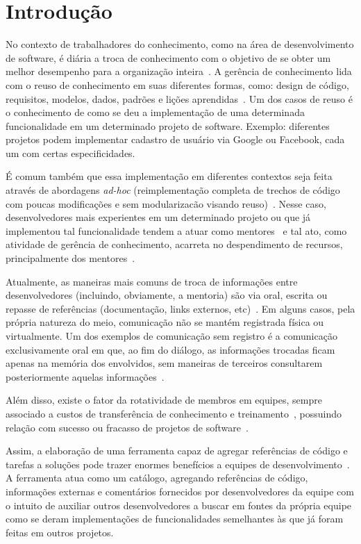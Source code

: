 \chapter{Introdução}

No contexto de trabalhadores do conhecimento, como na área de desenvolvimento de software, é diária a troca de conhecimento com o objetivo de se obter um melhor desempenho para a organização inteira~\cite{Druker1993, Wiig2003}. A gerência de conhecimento lida com o reuso de conhecimento em  suas diferentes formas, como: design de código, requisitos, modelos, dados, padrões e lições aprendidas~\cite{Levy2009}. Um dos casos de reuso é o conhecimento de como se deu a implementação de uma determinada funcionalidade em um determinado projeto de software. Exemplo: diferentes projetos podem implementar cadastro de usuário via Google ou Facebook, cada um com certas especificidades.

É comum também que essa implementação em diferentes contextos seja feita através de abordagens \textit{ad-hoc} (reimplementação completa de trechos de código com poucas modificações e sem modularizacão visando reuso)~\cite{SangMok2011}. Nesse caso, desenvolvedores mais experientes em um determinado projeto ou que já implementou tal funcionalidade tendem a atuar como mentores~\cite{CubraniC2004} e tal ato, como atividade de gerência de conhecimento, acarreta no despendimento de recursos, principalmente dos mentores~\cite{Wiig2003}.

Atualmente, as maneiras mais comuns de troca de informações entre desenvolvedores (incluindo, obviamente, a mentoria) são via oral, escrita ou repasse de referências (documentação, links externos, etc)~\cite{Storey2014, Olson2000, CubraniC2004}. Em alguns casos, pela própria natureza do meio, comunicação não se mantém registrada física ou virtualmente. Um dos exemplos de comunicação sem registro é a comunicação exclusivamente oral em que, ao fim do diálogo, as informações trocadas ficam apenas na memória dos envolvidos, sem maneiras de terceiros consultarem posteriormente aquelas informações~\cite{Olson2000}.

Além disso, existe o fator da rotatividade de membros em equipes, sempre associado a custos de transferência de conhecimento e treinamento~\cite{Hall2008}, possuindo relação com sucesso ou fracasso de projetos de software~\cite{Hall2008}.

Assim, a elaboração de uma ferramenta capaz de agregar referências de código e tarefas a soluções pode trazer enormes benefícios a equipes de desenvolvimento~\cite{CubraniC2004}. A ferramenta atua como um catálogo, agregando referências de código, informações externas e comentários fornecidos por desenvolvedores da equipe com o intuito de auxiliar outros desenvolvedores a buscar em fontes da própria equipe como se deram implementações de funcionalidades semelhantes às que já foram feitas em outros projetos.

